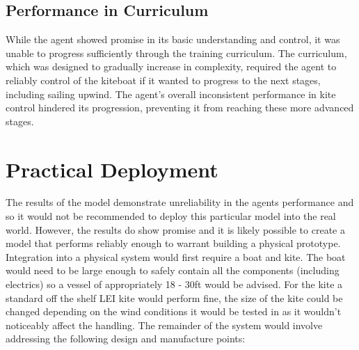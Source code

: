 \subsection*{Performance in Curriculum}
While the agent showed promise in its basic understanding and control, it was unable to progress sufficiently through the training curriculum. The curriculum, which was designed to gradually increase in complexity, required the agent to reliably control of the kiteboat if it wanted to progress to the next stages, including sailing upwind. The agent's overall inconsistent performance in kite control hindered its progression, preventing it from reaching these more advanced stages.


\section{Practical Deployment}\label{sec:practical_deployment}
The results of the model demonstrate unreliability in the agents performance and so it would not be recommended to deploy this particular model into the real world. However, the results do show promise and it is likely possible to create a model that performs reliably enough to warrant building a physical prototype. Integration into a physical system would first require a boat and kite. The boat would need to be large enough to safely contain all the components (including electrics) so a vessel of appropriately 18 - 30ft would be advised. For the kite a standard off the shelf LEI kite would perform fine, the size of the kite could be changed depending on the wind conditions it would be tested in as it wouldn't noticeably affect the handling. The remainder of the system would involve addressing the following design and manufacture points:  


